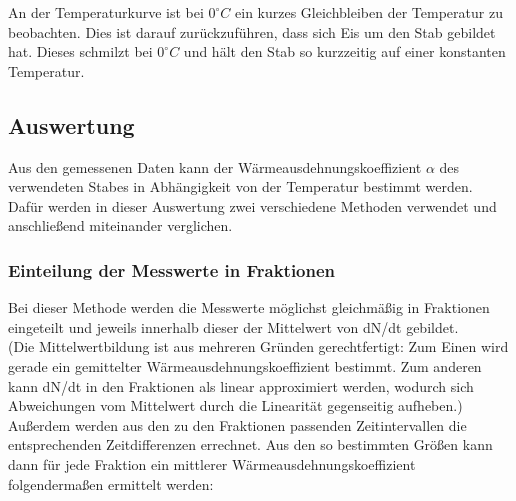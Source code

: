 An der Temperaturkurve ist bei $ 0 ^{\circ} C $ ein kurzes Gleichbleiben der Temperatur zu beobachten. Dies ist darauf zurückzuführen, dass sich Eis um den Stab gebildet hat. Dieses schmilzt bei $ 0 ^{\circ} C $ und hält den Stab so kurzzeitig auf einer konstanten Temperatur.

\subsection{Auswertung}
Aus den gemessenen Daten kann der Wärmeausdehnungskoeffizient $ \alpha $ des verwendeten Stabes in Abhängigkeit von der Temperatur bestimmt werden. Dafür werden in dieser Auswertung zwei verschiedene Methoden verwendet und anschließend miteinander verglichen.

\subsubsection{Einteilung der Messwerte in Fraktionen}
Bei dieser Methode werden die Messwerte möglichst gleichmäßig in Fraktionen eingeteilt und jeweils innerhalb dieser der Mittelwert von dN/dt gebildet.\\(Die Mittelwertbildung ist aus mehreren Gründen gerechtfertigt: Zum Einen wird gerade ein gemittelter Wärmeausdehnungskoeffizient bestimmt. Zum anderen kann dN/dt in den Fraktionen als linear approximiert werden, wodurch sich Abweichungen vom Mittelwert durch die Linearität gegenseitig aufheben.) Außerdem werden aus den zu den Fraktionen passenden Zeitintervallen die entsprechenden Zeitdifferenzen errechnet. Aus den so bestimmten Größen kann dann für jede Fraktion ein mittlerer Wärmeausdehnungskoeffizient folgendermaßen ermittelt werden:

